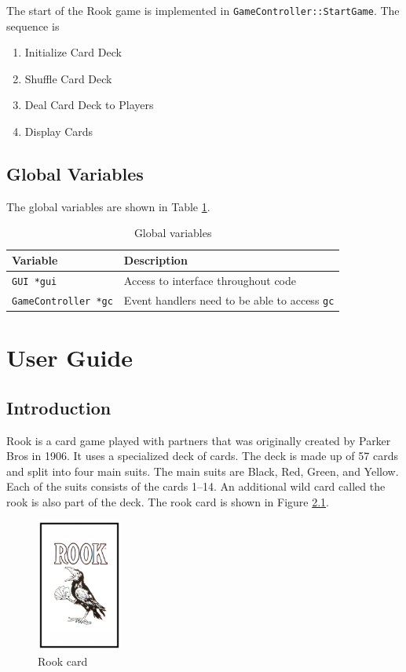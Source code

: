 \documentclass[12pt]{report}
\begin{document}
The start of the Rook game is implemented in \texttt{GameController::StartGame}. The sequence is

\begin{enumerate}
\item Initialize Card Deck
\item Shuffle Card Deck
\item Deal Card Deck to Players
\item Display Cards
\end{enumerate}

\section{Global Variables}

The global variables are shown in Table \ref{tab:globalvariables}.

\begin{table}[ht]
\centering
\begin{tabular}{l l}
\hline
Variable & Description \\ \hline
\texttt{GUI *gui} & Access to interface throughout code \\ \hline
\texttt{GameController *gc} & Event handlers need to be able to access \texttt{gc} \\ \hline
\end{tabular}
\caption{Global variables}
\label{tab:globalvariables}
\end{table}

\chapter{User Guide}

\section{Introduction}

Rook is a card game played with partners that was originally created by Parker Bros in 1906. It uses a specialized deck of cards. The deck is made up of 57 cards and split into four main suits. The main suits are Black, Red, Green, and Yellow. Each of the suits consists of the cards 1--14. An additional wild card called the rook is also part of the deck. The rook card is shown in Figure \ref{fig:rookcard}.

\begin{figure}[ht]
\caption{Rook card}
\label{fig:rookcard}
\begin{center}
\includegraphics[width=0.25\textwidth]{images/rook}
\end{center}
\end{figure}
\end{document}
